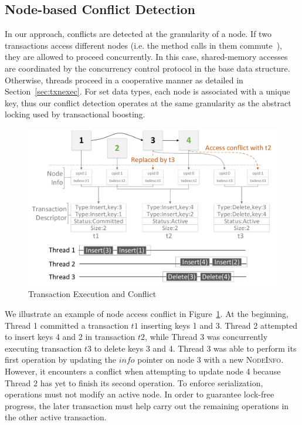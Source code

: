 \documentclass{sig-alternate-05-2015}
\begin{document}
\subsection{Node-based Conflict Detection}
In our approach, conflicts are detected at the granularity of a node. 
If two transactions access different nodes (i.e. the method calls in them commute~\cite{herlihy2008transactional}), they are allowed to proceed concurrently. 
In this case, shared-memory accesses are coordinated by the concurrency control protocol in the base data structure.
Otherwise, threads proceed in a cooperative manner as detailed in Section~\ref{sec:txnexec}.
For set data types, each node is associated with a unique key, thus our conflict detection operates at the same granularity as the abstract locking used by transactional boosting.

\begin{figure}[h]
    \centering
    \includegraphics[width=1\columnwidth]{figure/lfttconflict.pdf}
    \caption{Transaction Execution and Conflict}
    \label{fig:lfttconflict}
\end{figure}
\vspace{-0.1in}

We illustrate an example of node access conflict in Figure~\ref{fig:lfttconflict}.
At the beginning, Thread 1 committed a transaction $t1$ inserting keys 1 and 3. 
Thread 2 attempted to insert keys 4 and 2 in transaction $t2$, while Thread 3 was concurrently executing transaction $t3$ to delete keys 3 and 4.
Thread 3 was able to perform its first operation by updating the $info$ pointer on node 3 with a new \textsc{NodeInfo}.
However, it encounters a conflict when attempting to update node 4 because Thread 2 has yet to finish its second operation.
To enforce serialization, operations must not modify an active node. 
In order to guarantee lock-free progress, the later transaction must help carry out the remaining operations in the other active transaction.
\end{document}
